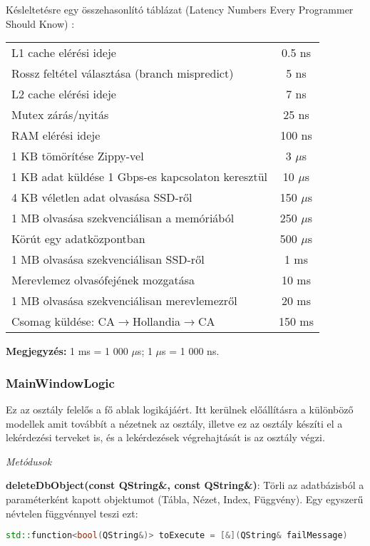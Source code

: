 Késleltetésre egy összehasonlító táblázat (Latency Numbers Every Programmer Should Know\cite{latency}) :
\begin{center}
\begin{tabular}{ l | c }
  L1 cache elérési ideje & 0.5 ns \\
  Rossz feltétel választása (branch mispredict) & 5 ns \\
  L2 cache elérési ideje & 7 ns \\
  Mutex zárás/nyitás & 25 ns \\
  RAM elérési ideje & 100 ns \\
  1 KB tömörítése Zippy-vel & 3 $\mu$s \\
  1 KB adat küldése 1 Gbps-es kapcsolaton keresztül & 10 $\mu$s \\
  4 KB véletlen adat olvasása SSD-ről & 150 $\mu$s \\ 
  1 MB olvasása szekvenciálisan a memóriából  & 250 $\mu$s \\
  Körút egy adatközpontban & 500 $\mu$s \\
  1 MB olvasása szekvenciálisan SSD-ről  &  1 ms \\
  Merevlemez olvasófejének mozgatása & 10 ms \\
  1 MB olvasása szekvenciálisan merevlemezről  &  20 ms \\
  Csomag küldése: CA$\rightarrow$Hollandia$\rightarrow$CA & 150 ms
\end{tabular}
\end{center}

\textbf{Megjegyzés:} 1 ms = 1 000 $\mu$s; 1 $\mu$s = 1 000 ns.

\subsubsection{MainWindowLogic}

Ez az osztály felelős a fő ablak logikájáért. Itt kerülnek előállításra a különböző modellek
amit továbbít a nézetnek az osztály, illetve ez az osztály készíti el a lekérdezési terveket is, és a lekérdezések végrehajtását is az osztály végzi.

\begin{flushleft}
\textit{Metódusok}
\end{flushleft}
\textbf{deleteDbObject(const QString\&, const QString\&)}: Törli az adatbázisból a paraméterként kapott objektumot (Tábla, Nézet, Index, Függvény). Egy egyszerű névtelen függvénnyel teszi ezt:

\begin{lstlisting}[language=C++]
  std::function<bool(QString&)> toExecute = [&](QString& failMessage)
\end{lstlisting}

